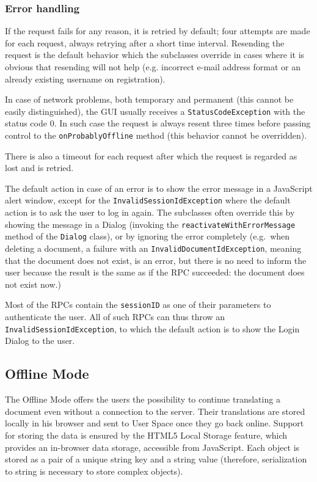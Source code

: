 \subsubsection{Error handling}

If the request fails for any reason, it is retried by default; four attempts are made for each request, always retrying after a short time interval.
Resending the request is the default behavior which the subclasses override in cases where it is obvious that resending will not help (e.g. incorrect e-mail address format or an already existing username on registration).

In case of network problems, both temporary and permanent (this cannot be easily distinguished), the GUI usually receives a {\tt StatusCodeException} with the status code 0. In such case the request is always resent three times before passing control to the {\tt onProbablyOffline} method (this behavior cannot be overridden).

There is also a timeout for each request after which the request is regarded as lost and is retried.

The default action in case of an error is to show the error message in a JavaScript alert window, except for the {\tt InvalidSessionIdException} where the default action is to ask the user to log in again.
The subclasses often override this by showing the message in a Dialog (invoking the {\tt reactivateWithErrorMessage} method of the {\tt Dialog} class), or by ignoring the error completely (e.g.\ when deleting a document, a failure with an {\tt InvalidDocumentIdException}, meaning that the document does not exist, is an error, but there is no need to inform the user because the result is the same as if the RPC succeeded: the document does not exist now.)

Most of the RPCs contain the {\tt sessionID} as one of their parameters to authenticate the user. All of such RPCs can thus throw an {\tt InvalidSessionIdException}, to which the default action is to show the Login Dialog to the user.

\subsection{Offline Mode}

The Offline Mode offers the users the possibility to continue translating a document even without a connection to the server. Their translations are stored locally in his browser and sent to User Space once they go back online.
Support for storing the data is ensured by the HTML5 Local Storage feature, which provides an in-browser data storage, accessible from JavaScript.
Each object is stored as a pair of a unique string key and a string value (therefore, serialization to string is necessary to store complex objects).

